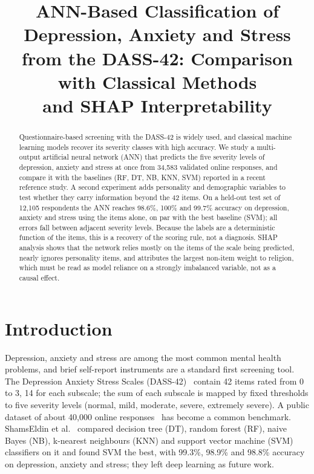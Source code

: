\documentclass[conference,compsoc]{IEEEtran}
\begin{document}
\title{ANN-Based Classification of Depression, Anxiety and Stress\\
from the DASS-42: Comparison with Classical Methods\\
and SHAP Interpretability}

\author{
}

\maketitle

\begin{abstract}
Questionnaire-based screening with the DASS-42 is widely used, and classical machine learning models recover its severity classes with high accuracy.
We study a multi-output artificial neural network (ANN) that predicts the five severity levels of depression, anxiety and stress at once from 34,583 validated online responses, and compare it with the baselines (RF, DT, NB, KNN, SVM) reported in a recent reference study.
A second experiment adds personality and demographic variables to test whether they carry information beyond the 42 items.
On a held-out test set of 12,105 respondents the ANN reaches 98.6\%, 100\% and 99.7\% accuracy on depression, anxiety and stress using the items alone, on par with the best baseline (SVM); all errors fall between adjacent severity levels.
Because the labels are a deterministic function of the items, this is a recovery of the scoring rule, not a diagnosis.
SHAP analysis shows that the network relies mostly on the items of the scale being predicted, nearly ignores personality items, and attributes the largest non-item weight to religion, which must be read as model reliance on a strongly imbalanced variable, not as a causal effect.
\end{abstract}

\section{Introduction}
Depression, anxiety and stress are among the most common mental health problems, and brief self-report instruments are a standard first screening tool.
The Depression Anxiety Stress Scales (DASS-42)~\cite{lovibond} contain 42 items rated from 0 to 3, 14 for each subscale; the sum of each subscale is mapped by fixed thresholds to five severity levels (normal, mild, moderate, severe, extremely severe).
A public dataset of about 40,000 online responses~\cite{kaggle} has become a common benchmark.
ShamsEldin et al.~\cite{shams} compared decision tree (DT), random forest (RF), naive Bayes (NB), k-nearest neighbours (KNN) and support vector machine (SVM) classifiers on it and found SVM the best, with 99.3\%, 98.9\% and 98.8\% accuracy on depression, anxiety and stress; they left deep learning as future work.
\end{document}
